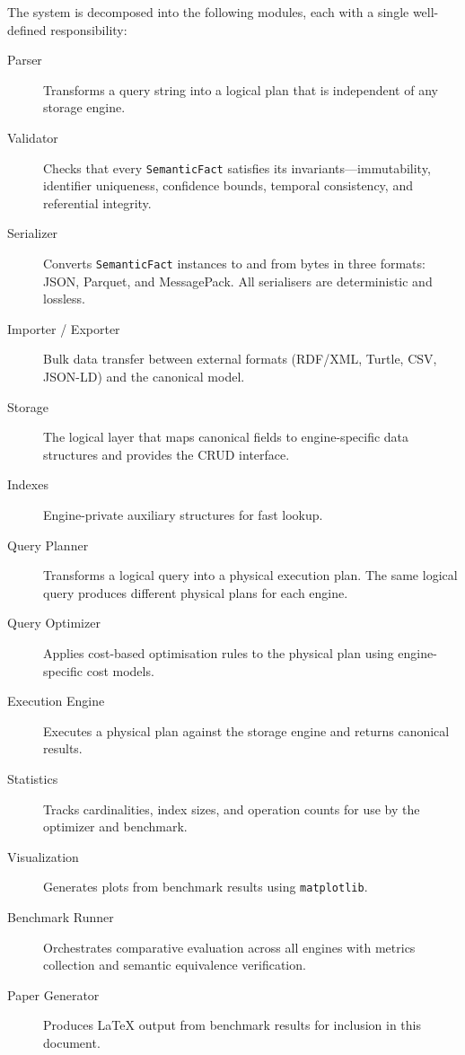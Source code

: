 The system is decomposed into the following modules, each with a single
well-defined responsibility:

\begin{description}
    \item[Parser] Transforms a query string into a logical plan that is
        independent of any storage engine.
    \item[Validator] Checks that every \texttt{SemanticFact} satisfies
        its invariants---immutability, identifier uniqueness, confidence
        bounds, temporal consistency, and referential integrity.
    \item[Serializer] Converts \texttt{SemanticFact} instances to and
        from bytes in three formats: JSON, Parquet, and MessagePack.
        All serialisers are deterministic and lossless.
    \item[Importer / Exporter] Bulk data transfer between external
        formats (RDF/XML, Turtle, CSV, JSON-LD) and the canonical
        model.
    \item[Storage] The logical layer that maps canonical fields to
        engine-specific data structures and provides the CRUD interface.
    \item[Indexes] Engine-private auxiliary structures for fast lookup.
    \item[Query Planner] Transforms a logical query into a physical
        execution plan.  The same logical query produces different
        physical plans for each engine.
    \item[Query Optimizer] Applies cost-based optimisation rules to the
        physical plan using engine-specific cost models.
    \item[Execution Engine] Executes a physical plan against the storage
        engine and returns canonical results.
    \item[Statistics] Tracks cardinalities, index sizes, and operation
        counts for use by the optimizer and benchmark.
    \item[Visualization] Generates plots from benchmark results using
        \texttt{matplotlib}.
    \item[Benchmark Runner] Orchestrates comparative evaluation across
        all engines with metrics collection and semantic equivalence
        verification.
    \item[Paper Generator] Produces \LaTeX{} output from benchmark
        results for inclusion in this document.
\end{description}

